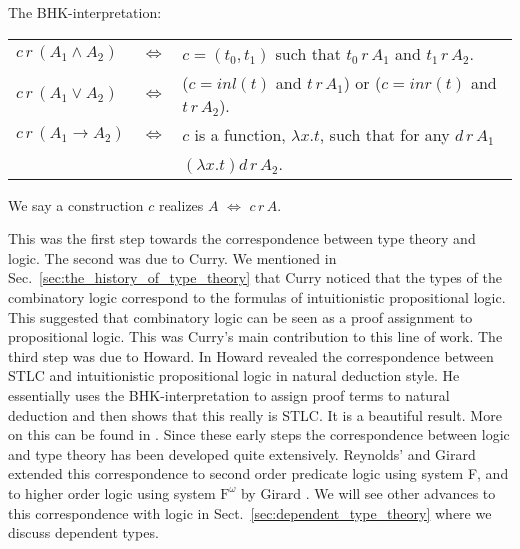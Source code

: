 \documentclass{article}
\begin{document}
\begin{definition}
  \label{def:bhk-interpretation}
  The BHK-interpretation:\\
  \begin{center}
          \begin{tabular}{lll}
      $c\,r\,(A_1 \land A_2)$ & $\iff$ & $c = (t_0,t_1)$ such that $t_0\,r\,A_1$ and 
            $t_1\,r\,A_2$.\\
      $c\,r\,(A_1 \lor A_2)$  & $\iff$ & ($c = inl(t)$ and $t\,r\,A_1$) or ($c = inr(t)$ and 
            $t\,r\,A_2$).\\
      $c\,r\,(A_1 \to A_2)$   & $\iff$ & $c$ is a function, $\lambda x.t$, such that for any 
            $d\,r\,A_1$ \\
                              &     & $(\lambda x.t)d\,r\,A_2$.
    \end{tabular}
  \end{center}
  We say a construction $c$ realizes $A$ $\iff$ $c\,r\,A$.  
\end{definition}
This was the first step towards the correspondence between type theory
and logic.  The second was due to Curry.  We mentioned in
Sec.~\ref{sec:the_history_of_type_theory} that Curry noticed that the
types of the combinatory logic correspond to the formulas of
intuitionistic propositional logic.  This suggested that combinatory
logic can be seen as a proof assignment to propositional logic.  This
was Curry's main contribution to this line of work.  The third step
was due to Howard.  In \cite{Howard:1980} Howard revealed the
correspondence between STLC and intuitionistic propositional logic in
natural deduction style.  He essentially uses the BHK-interpretation
to assign proof terms to natural deduction and then shows that this
really is STLC.  It is a beautiful result.  More on this can be found
in
\cite{Griffin:1990,Howard:1980,Mints:2000,Murthy:1991,Sorensen:2006,Troelstra:1991}.
Since these early steps the correspondence between logic and type
theory has been developed quite extensively.  Reynolds' and Girard
extended this correspondence to second order predicate logic using
system F, and to higher order logic using system $\text{F}^\omega$ by
Girard \cite{Wadler:2007,Girard:1971}.  We will see other advances to this
correspondence with logic in Sect.~\ref{sec:dependent_type_theory} where
we discuss dependent types.
\end{document}
